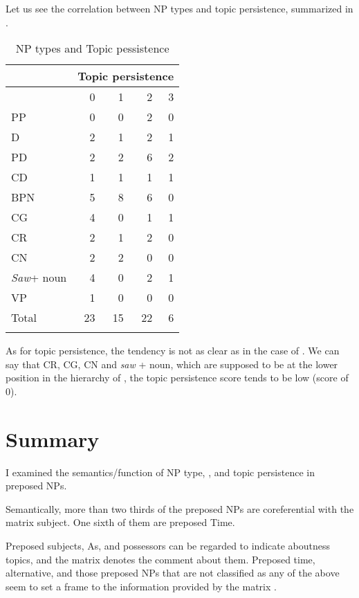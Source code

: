 \documentclass[output=paper
,modfonts
,nonflat]{langsci/langscibook}
\begin{document}
Let us see the correlation between NP types and topic persistence, summarized in .

\begin{table}
\begin{tabularx}{\textwidth}{Xrrrr} 
	\lsptoprule
	& \multicolumn{4}{c}{Topic persistence}\\
	\midrule
	&  0 &  1 &  2 &  3\\
	PP &  0 &  0 &  2 &  0\\
	D &  2 &  1 &  2 &  1\\
	PD &  2 &  2 &  6 &  2\\
	CD &  1 &  1 &  1 &  1\\
	BPN &  5 &  8 &  6 &  0\\
	CG &  4 &  0 &  1 &  1\\
	CR &  2 &  1 &  2 &  0\\
	CN &  2 &  2 &  0 &  0\\
	\textit{Saw}+ noun &  4 &  0 &  2 &  1\\
	VP &  1 &  0 &  0 &  0\\
	\midrule
	Total &  23 &  15 &  22 &  6\\
	\lspbottomrule
\end{tabularx}
	\caption{NP types and Topic pessistence}
	\label{tab:tsukida:13}
\end{table}

\newpage 
As for topic persistence, the tendency is not as clear as in the case of . We can say that CR, CG, CN and \textit{saw} + noun, which are supposed to be at the lower position in the  hierarchy of \citet{Gundel1993}, the topic persistence score tends to be low (score of 0).

\section{\label{s:tsukida:6}Summary}

I examined the semantics/function of NP type, , and topic persistence in preposed NPs. 

Semantically, more than two thirds of the preposed NPs are coreferential with the matrix subject. One sixth of them are preposed Time. 

Preposed subjects, As, and possessors can be regarded to indicate aboutness topics, and the matrix  denotes the comment about them. Preposed time, alternative, and those preposed NPs that are not classified as any of the above seem to set a frame to the information provided by the matrix . 
\end{document}
